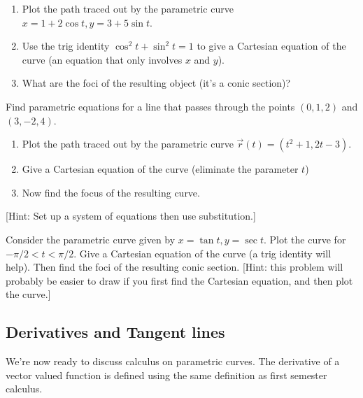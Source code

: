 \begin{problem}
\begin{enumerate}
	\item Plot the path traced out by the parametric curve $x=1+2\cos t, y=3+5\sin t$.  
	\item Use the trig identity $\cos^2t+\sin^2t=1$ to give a Cartesian equation of the curve (an equation that only involves $x$ and $y$). 
	\item What are the foci of the resulting object (it's a conic section)?
\end{enumerate}
\end{problem}

\begin{problem}\label{prob:line equation practice}    
Find parametric equations for a line that passes through the points $(0,1,2)$ and $(3,-2,4)$.
\end{problem}

\begin{problem}
\begin{enumerate}
	\item Plot the path traced out by the parametric curve $\vec r(t)= (t^2+1, 2t-3).$ 
	\item Give a Cartesian equation of the curve (eliminate the parameter $t$)
	\item Now find the focus of the resulting curve.
\end{enumerate}
[Hint: Set up a system of equations then use substitution.]
\end{problem}

\begin{problem}
Consider the parametric curve given by $x=\tan t, y=\sec t$. Plot the curve for $-\pi/2<t<\pi/2$. Give a Cartesian equation of the curve (a trig identity will help).  Then find the foci of the resulting conic section. [Hint: this problem will probably be easier to draw if you first find the Cartesian equation, and then plot the curve.]
\end{problem}

\subsection{Derivatives and Tangent lines}\label{sec:derivatives and tangent lines}
We're now ready to discuss calculus on parametric curves. The derivative of a vector valued function is defined using the same definition as first semester calculus.

